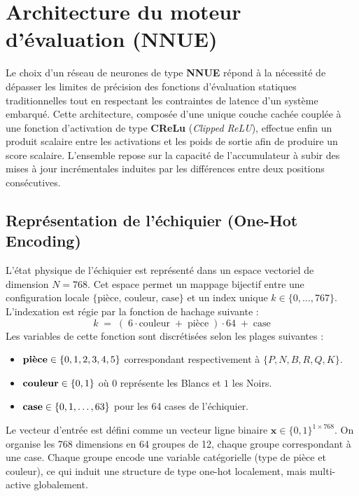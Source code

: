 \documentclass[11pt, a4paper]{article}
\begin{document}
\section{Architecture du moteur d'évaluation (NNUE)}
Le choix d'un réseau de neurones de type \textbf{NNUE} répond à la nécessité de dépasser les limites de précision des fonctions d'évaluation statiques traditionnelles tout en respectant les contraintes de latence d'un système embarqué. Cette architecture, composée d'une unique couche cachée couplée à une fonction d'activation de type \textbf{CReLu} (\textit{Clipped ReLU}), effectue enfin un produit scalaire entre les activations et les poids de sortie afin de produire un score scalaire. L'ensemble repose sur la capacité de l'accumulateur à subir des mises à jour incrémentales induites par les différences entre deux positions consécutives.

\subsection{Représentation de l'échiquier (One-Hot Encoding)}
L'état physique de l'échiquier est représenté dans un espace vectoriel de dimension $N=768$. Cet espace permet un mappage bijectif entre une configuration locale $\{\text{pièce, couleur, case}\}$ et un index unique $k \in \{0,\dots,767\}$. L'indexation est régie par la fonction de hachage suivante :
\begin{equation}
    k \;=\; (\;6 \cdot \text{couleur} \;+\; \text{pi\`ece}\;)\cdot 64 \;+\; \text{case}
\end{equation}
Les variables de cette fonction sont discrétisées selon les plages suivantes :
\begin{itemize}
    \item $\text{\textbf{pièce}} \in \{0, 1, 2, 3, 4, 5\}$ correspondant respectivement à $\{P, N, B, R, Q, K\}$.
    \item $\text{\textbf{couleur}} \in \{0, 1\}$ où $0$ représente les Blancs et $1$ les Noirs.
    \item $\text{\textbf{case}} \in \{0, 1, \dots, 63\}$ pour les 64 cases de l'échiquier.
\end{itemize}
Le vecteur d'entrée est défini comme un vecteur ligne binaire $\mathbf{x} \in \{0, 1\}^{1 \times 768}$. On organise les 768 dimensions en 64 groupes de 12, chaque groupe correspondant à une case. Chaque groupe encode une variable catégorielle (type de pièce et couleur), ce qui induit une structure de type one-hot localement, mais multi-active globalement.
\end{document}
